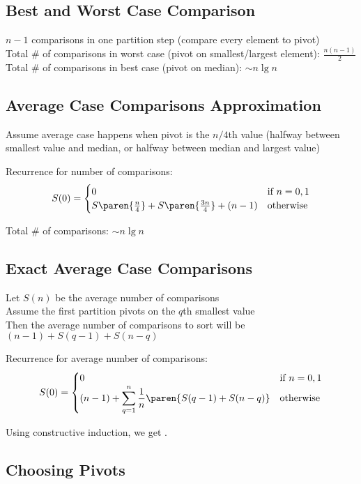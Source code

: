 \subsection*{Best and Worst Case Comparison}

$n-1$ comparisons in one partition step (compare every element to pivot)\\
Total \# of comparisons in worst case (pivot on smallest/largest element): $\displaystyle \frac{n(n-1)}{2}$\\
Total \# of comparisons in best case (pivot on median): $\displaystyle \sim n\lg n$

\subsection*{Average Case Comparisons Approximation}

Assume average case happens when pivot is the $n/4$th value (halfway between smallest value and median, or halfway between median and largest value)

Recurrence for number of comparisons:
\[S(0) = \begin{cases}
    0 & \text{if } n = 0, 1 \\
    S\paren{\frac n 4} + S\paren{\frac{3n}{4}} + (n - 1) & \text{otherwise}
\end{cases}\]

Total \# of comparisons: $\sim n\lg n$

\subsection*{Exact Average Case Comparisons}

Let $S(n)$ be the average number of comparisons\\
Assume the first partition pivots on the $q$th smallest value\\
Then the average number of comparisons to sort will be $(n-1) + S(q-1) + S(n-q)$

Recurrence for average number of comparisons:
\[S(0) = \begin{cases}
    0 & \text{if } n = 0, 1 \\
    \displaystyle (n-1) + \sum_{q=1}^n \frac 1 n \paren{S(q-1) + S(n-q)} & \text{otherwise}
\end{cases}\]

Using constructive induction, we get .

\subsection*{Choosing Pivots}

